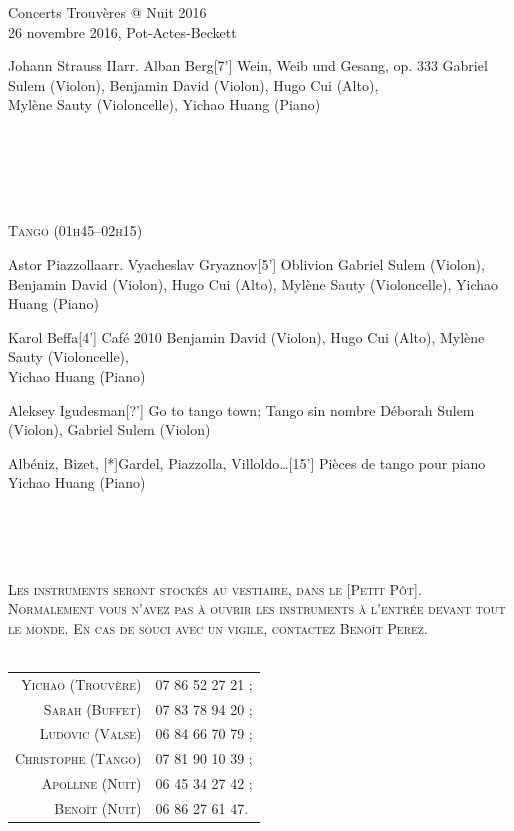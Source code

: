 \documentclass[a4paper,11pt,poets,durations]{ConcProg}
\begin{document}
{\begin{programme}{
    Concerts Trouvères @ Nuit 2016
\\  {\normalsize 26 novembre 2016, Pot-Actes-Beckett}
}
\begin{part}[]
\begin{composition}{Johann Strauss II}{arr. Alban Berg}{[7'] Wein, Weib und Gesang, op. 333}{}
      {\small Gabriel Sulem (Violon), Benjamin David (Violon), Hugo Cui (Alto),\\Mylène Sauty (Violoncelle), Yichao Huang (Piano)}
    \end{composition}\\
~\\
~\\
~\\
\begin{center}
\textsc{Tango (01h45--02h15)}
\end{center}
    \begin{composition}{Astor Piazzolla}{arr. Vyacheslav Gryaznov}{[5'] Oblivion}{}
      {\small Gabriel Sulem (Violon), Benjamin David (Violon), Hugo Cui (Alto), Mylène Sauty (Violoncelle), Yichao Huang (Piano)}
    \end{composition}
    \begin{composition}{Karol Beffa}{}{[4'] Café 2010}{}
      {\small Benjamin David (Violon), Hugo Cui (Alto), Mylène Sauty (Violoncelle),\\Yichao Huang (Piano)}
    \end{composition}
    \begin{composition}{Aleksey Igudesman}{}{[?'] Go to tango town; Tango sin nombre}{}
      {\small Déborah Sulem (Violon), Gabriel Sulem (Violon)}
    \end{composition}
    \begin{composition}{Albéniz, Bizet, [*]Gardel, Piazzolla, Villoldo\dots}{}{[15'] Pièces de tango pour piano}{}
      {\small Yichao Huang (Piano)}
    \end{composition}\\
~\\
~\\
\begin{center}
\textsc{Les instruments seront stockés au vestiaire, dans le [Petit Pôt].\\Normalement vous n'avez pas à ouvrir les instruments à l'entrée devant tout le monde. En cas de souci avec un vigile, contactez Benoît Perez.}\\
~\\
\begin{tabular}{rl}
\textsc{Yichao (Trouvère)} & \textsc{07 86 52 27 21 ;}\\
\textsc{Sarah (Buffet)} & \textsc{07 83 78 94 20 ;}\\
\textsc{Ludovic (Valse)} & \textsc{06 84 66 70 79 ;}\\
\textsc{Christophe (Tango)} & \textsc{07 81 90 10 39 ;}\\
\textsc{Apolline (Nuit)} & \textsc{06 45 34 27 42 ;}\\
\textsc{Benoît (Nuit)} & \textsc{06 86 27 61 47.}
\end{tabular}
\end{center}
  \end{part}
\end{programme}
}
\end{document}
